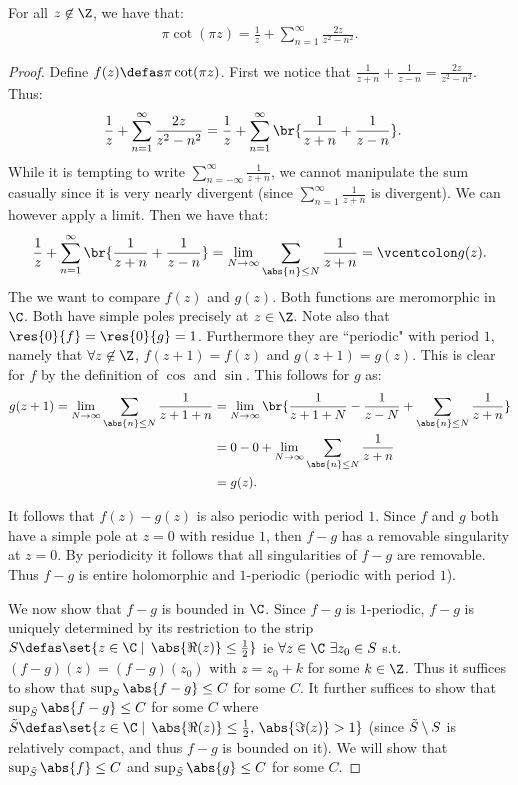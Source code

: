 \begin{proposition}[Lindel{\"o}f]\label{prop:lindelof}
For all $z \not\in \Z$, we have that:
\begin{align*}
    \pi \cot(\pi z) = \frac{1}{z} + \sum_{n=1}^\infty \frac{2 z }{z^2-n^2}.
\end{align*}
\end{proposition}
\begin{proof}
Define $f(z) \defas \pi \cot(\pi z)$. First we notice that $\frac{1}{z+n} + \frac{1}{z-n} = \frac{2z}{z^2 - n^2}$. Thus:
\begin{align*}
    \frac{1}{z} + \sum_{n=1}^\infty \frac{2 z }{z^2-n^2} &= \frac{1}{z} + \sum_{n=1}^\infty \br{\frac{1}{z+n} + \frac{1}{z-n}}.
\end{align*}
While it is tempting to write $\sum_{n=-\infty}^\infty \frac{1}{z+n}$, we cannot manipulate the sum casually since it is very nearly divergent (since $\sum_{n=1}^\infty \frac{1}{z+n}$ is divergent). We can however apply a limit. Then we have that:
\begin{align*}
    \frac{1}{z} + \sum_{n=1}^\infty \br{\frac{1}{z+n} + \frac{1}{z-n}} = \lim_{N \to \infty}\sum_{\abs{n} \leq N} \frac{1}{z+n} = \vcentcolon g(z).
\end{align*}
The we want to compare $f(z)$ and $g(z)$. Both functions are meromorphic in $\C$. Both have simple poles precisely at $z \in \Z$. Note also that $\res{0}{f} = \res{0}{g} = 1$. Furthermore they are ``periodic" with period $1$, namely that $\forall z \not\in \Z$, $f(z+1) = f(z)$ and $g(z+1) = g(z)$. This is clear for $f$ by the definition of $\cos$ and $\sin$. This follows for $g$ as:
\begin{align*}
    g(z+1) = \lim_{N \to \infty}\sum_{\abs{n} \leq N} \frac{1}{z+1+n} &= \lim_{N \to \infty} \br{ \frac{1}{z+1+N} - \frac{1}{z-N} + \sum_{\abs{n} \leq N} \frac{1}{z+n}}\\
    &= 0 - 0 + \lim_{N \to \infty}\sum_{\abs{n} \leq N} \frac{1}{z+n}\\
    &= g(z).
\end{align*}

It follows that $f(z) - g(z)$ is also periodic with period $1$. Since $f$ and $g$ both have a simple pole at $z=0$ with residue $1$, then $f-g$ has a removable singularity at $z=0$. By periodicity it follows that all singularities of $f-g$ are removable. Thus $f-g$ is entire holomorphic and $1$-periodic (periodic with period $1$).



We now show that $f-g$ is bounded in $\C$. Since $f-g$ is $1$-periodic, $f-g$ is uniquely determined by its restriction to the strip $S \defas \set{z \in \C \mid \, \abs{\Re(z)} \leq \frac{1}{2}}$ ie $\forall z \in \C \, \, \exists z_0 \in S$ s.t. $(f-g)(z) = (f-g)(z_0)$ with $z = z_0 + k$ for some $k \in \Z$. Thus it suffices to show that $\sup_{S} \abs{f-g} \leq C $ for some $C$. It further suffices to show that $\sup_{\Tilde{S}} \abs{f-g} \leq C $ for some $C$ where $\Tilde{S} \defas \set{z \in \C \mid \, \abs{\Re(z)} \leq \frac{1}{2}, \, \abs{\Im (z)} >1 }$ (since $\Tilde{S} \setminus S$ is relatively compact, and thus $f-g$ is bounded on it). We will show that $\sup_{\Tilde{S}} \abs{f} \leq C $ and $\sup_{\Tilde{S}} \abs{g} \leq C $ for some $C$.


\end{proof}
